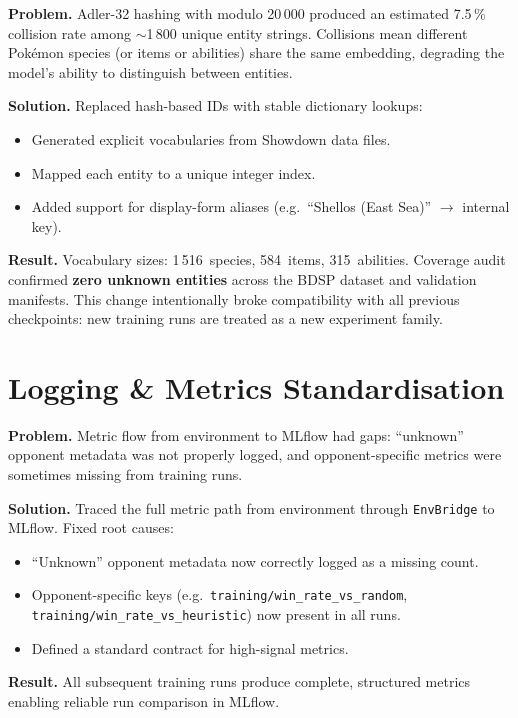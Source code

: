 \textbf{Problem.} Adler-32 hashing with modulo 20\,000 produced an estimated
7.5\,\% collision rate among $\sim$1\,800 unique entity strings.  Collisions
mean different Pok\'{e}mon species (or items or abilities) share the same
embedding, degrading the model's ability to distinguish between entities.

\textbf{Solution.} Replaced hash-based IDs with stable dictionary lookups:

\begin{itemize}
  \item Generated explicit vocabularies from Showdown data files.
  \item Mapped each entity to a unique integer index.
  \item Added support for display-form aliases (e.g.\ ``Shellos (East Sea)''
        $\to$ internal key).
\end{itemize}

\textbf{Result.} Vocabulary sizes: 1\,516~species, 584~items, 315~abilities.
Coverage audit confirmed \textbf{zero unknown entities} across the BDSP
dataset and validation manifests.  This change intentionally broke
compatibility with all previous checkpoints: new training runs are treated as
a new experiment family.

\section{Logging \& Metrics Standardisation}

\textbf{Problem.} Metric flow from environment to MLflow had gaps:
``unknown'' opponent metadata was not properly logged, and opponent-specific
metrics were sometimes missing from training runs.

\textbf{Solution.} Traced the full metric path from environment through
\texttt{EnvBridge} to MLflow.  Fixed root causes:
\begin{itemize}
  \item ``Unknown'' opponent metadata now correctly logged as a missing count.
  \item Opponent-specific keys (e.g.\
        \texttt{training/win\_rate\_vs\_random},
        \texttt{training/win\_rate\_vs\_heuristic}) now present in all runs.
  \item Defined a standard contract for high-signal metrics.
\end{itemize}

\textbf{Result.} All subsequent training runs produce complete, structured
metrics enabling reliable run comparison in MLflow.

